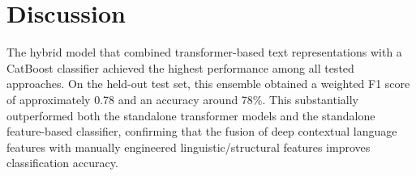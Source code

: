 

\chapter{Discussion\label{chap:discussion}}


The hybrid model that combined transformer-based text representations with a \ac{CatBoost} classifier achieved the highest performance among all tested approaches. On the held-out test set, this ensemble obtained a weighted F1 score of approximately 0.78 and an accuracy around 78\%. This substantially outperformed both the standalone transformer models and the standalone feature-based classifier, confirming that the fusion of deep contextual language features with manually engineered linguistic/structural features improves classification accuracy. 

